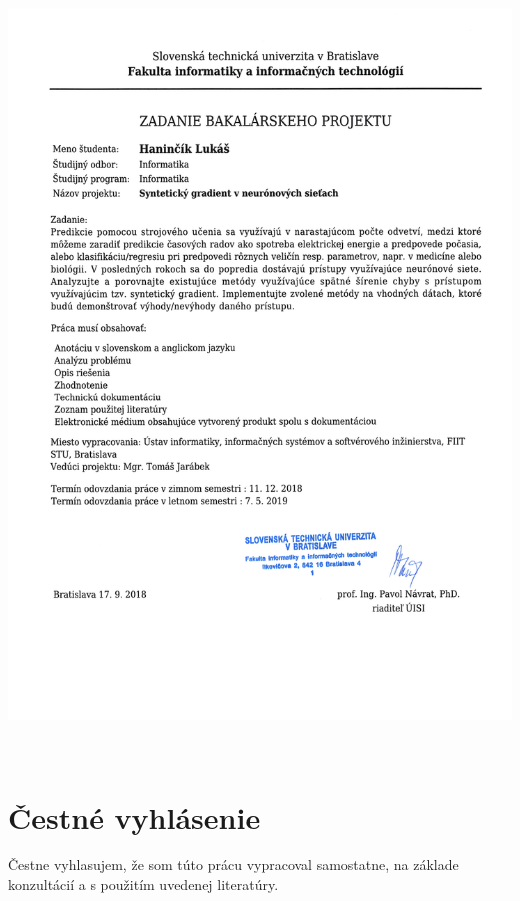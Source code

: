 \documentclass[12pt, twoside]{book}
\begin{document}
\eject %






\newpage 
\afterpage{\null\thispagestyle{empty}\newpage}

\thispagestyle{empty}
\hspace{-3.5cm}\includegraphics[width=1.25\textwidth]{images/zadanie}


\frontmatter


\setcounter{page}{3}
\newpage 
~
\section*{Čestné vyhlásenie}
\vfill
Čestne vyhlasujem, že som túto prácu vypracoval samostatne, na základe konzultácií a s použitím uvedenej literatúry.
\end{document}
